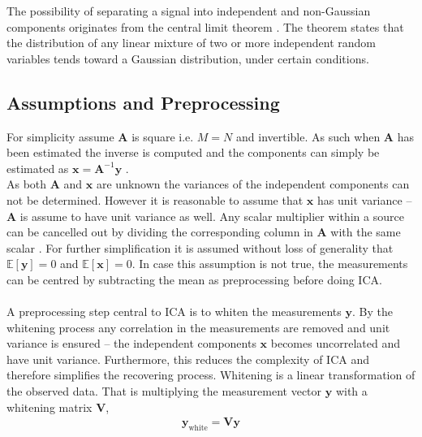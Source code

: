 The possibility of separating a signal into independent and non-Gaussian components originates from the central limit theorem \cite[p. 34]{ICA}. 
The theorem states that the distribution of any linear mixture of two or more independent random variables tends toward a Gaussian distribution, under certain conditions. 

\subsection{Assumptions and Preprocessing}
For simplicity assume $\mathbf{A}$ is square i.e. $M = N$ and invertible. 
As such when $\mathbf{A}$ has been estimated the inverse is computed and the components can simply be estimated as $\mathbf{x} = \mathbf{A}^{-1} \mathbf{y}$ \cite[p. 152-153]{ICA}.
\\ 
As both $\mathbf{A}$ and $\mathbf{x}$ are unknown the variances of the independent components can not be determined. 
However it is reasonable to assume that $\mathbf{x}$ has unit variance -- $\mathbf{A}$ is assume to have unit variance as well. 
Any scalar multiplier within a source can be cancelled out by dividing the corresponding column in $\mathbf{A}$ with the same scalar \cite[p. 154]{ICA}.
For further simplification it is assumed without loss of generality that $\mathbb{E}[\mathbf{y}] = 0$ and $\mathbb{E}[\mathbf{x}] = 0$\cite[p. 154]{ICA}. 
In case this assumption is not true, the measurements can be centred by subtracting the mean as preprocessing before doing ICA.
\\ \\
A preprocessing step central to ICA is to whiten the measurements $\mathbf{y}$. 
By the whitening process any correlation in the measurements are removed and unit variance is ensured -- the independent components $\mathbf{x}$ becomes uncorrelated and have unit variance. 
Furthermore, this reduces the complexity of ICA and therefore simplifies the recovering process.
Whitening is a linear transformation of the observed data. 
That is multiplying the measurement vector $\textbf{y}$ with a whitening matrix $\textbf{V}$,
\begin{align*}
\textbf{y}_{\text{white}} = \textbf{V}\textbf{y}
\end{align*} 
